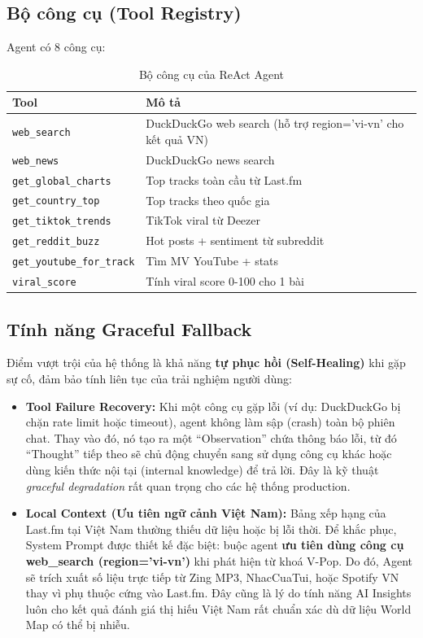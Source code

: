 \documentclass[12pt,a4paper]{report}
\begin{document}
\subsection{Bộ công cụ (Tool Registry)}

Agent có 8 công cụ:

\begin{table}[H]
\centering
\caption{Bộ công cụ của ReAct Agent}
\label{tab:tools}
\begin{tabular}{|l|l|}
\hline
\textbf{Tool} & \textbf{Mô tả} \\
\hline
\texttt{web\_search} & DuckDuckGo web search (hỗ trợ region='vi-vn' cho kết quả VN) \\
\texttt{web\_news} & DuckDuckGo news search \\
\texttt{get\_global\_charts} & Top tracks toàn cầu từ Last.fm \\
\texttt{get\_country\_top} & Top tracks theo quốc gia \\
\texttt{get\_tiktok\_trends} & TikTok viral từ Deezer \\
\texttt{get\_reddit\_buzz} & Hot posts + sentiment từ subreddit \\
\texttt{get\_youtube\_for\_track} & Tìm MV YouTube + stats \\
\texttt{viral\_score} & Tính viral score 0-100 cho 1 bài \\
\hline
\end{tabular}
\end{table}

\subsection{Tính năng Graceful Fallback}

Điểm vượt trội của hệ thống là khả năng \textbf{tự phục hồi (Self-Healing)} khi gặp sự cố, đảm bảo tính liên tục của trải nghiệm người dùng:
\begin{itemize}[leftmargin=*]
    \item \textbf{Tool Failure Recovery:} Khi một công cụ gặp lỗi (ví dụ: DuckDuckGo bị chặn rate limit hoặc timeout), agent không làm sập (crash) toàn bộ phiên chat. Thay vào đó, nó tạo ra một ``Observation'' chứa thông báo lỗi, từ đó ``Thought'' tiếp theo sẽ chủ động chuyển sang sử dụng công cụ khác hoặc dùng kiến thức nội tại (internal knowledge) để trả lời. Đây là kỹ thuật \textit{graceful degradation} rất quan trọng cho các hệ thống production.
    \item \textbf{Local Context (Ưu tiên ngữ cảnh Việt Nam):} Bảng xếp hạng của Last.fm tại Việt Nam thường thiếu dữ liệu hoặc bị lỗi thời. Để khắc phục, System Prompt được thiết kế đặc biệt: buộc agent \textbf{ưu tiên dùng công cụ web\_search (region='vi-vn')} khi phát hiện từ khoá V-Pop. Do đó, Agent sẽ trích xuất số liệu trực tiếp từ Zing MP3, NhacCuaTui, hoặc Spotify VN thay vì phụ thuộc cứng vào Last.fm. Đây cũng là lý do tính năng AI Insights luôn cho kết quả đánh giá thị hiếu Việt Nam rất chuẩn xác dù dữ liệu World Map có thể bị nhiễu.
\end{itemize}
\end{document}
